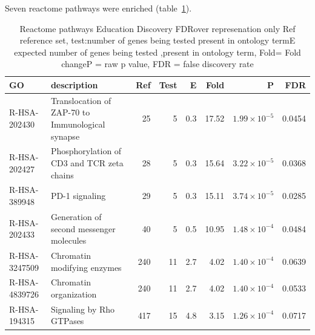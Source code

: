 Seven reactome pathways were enriched (table~\ref{tab:Reactome pathways Education Discovery FDRover represenation only}).
\begin{table}[ht]
\centering
\begin{adjustbox}{width=\textwidth}
\begin{tabular}{llrrrrrr}
  \hline
GO & description & Ref & Test & E & Fold & P & FDR \\ 
  \hline
R-HSA-202430 & Translocation of ZAP-70 to Immunological synapse  & 25 & 5 & 0.3 & 17.52 & $1.99 \times 10^{-5}$ & 0.0454 \\ 
  R-HSA-202427 & Phosphorylation of CD3 and TCR zeta chains  & 28 & 5 & 0.3 & 15.64 & $3.22 \times 10^{-5}$ & 0.0368 \\ 
  R-HSA-389948 & PD-1 signaling  & 29 & 5 & 0.3 & 15.11 & $3.74 \times 10^{-5}$ & 0.0285 \\ 
  R-HSA-202433 & Generation of second messenger molecules  & 40 & 5 & 0.5 & 10.95 & $1.48 \times 10^{-4}$ & 0.0484 \\ 
  R-HSA-3247509 & Chromatin modifying enzymes  & 240 & 11 & 2.7 & 4.02 & $1.40 \times 10^{-4}$ & 0.0639 \\ 
  R-HSA-4839726 & Chromatin organization  & 240 & 11 & 2.7 & 4.02 & $1.40 \times 10^{-4}$ & 0.0533 \\ 
  R-HSA-194315 & Signaling by Rho GTPases  & 417 & 15 & 4.8 & 3.15 & $1.26 \times 10^{-4}$ & 0.0717 \\ 
   \hline
\end{tabular}
\end{adjustbox}
\caption{Reactome pathways Education Discovery FDRover represenation only  Ref reference set, test:number of genes being tested present in ontology termE expected number of genes being tested ,present in ontology term, Fold= Fold changeP = raw p value, FDR = false discovery rate} 
\label{tab:Reactome pathways Education Discovery FDRover represenation only}
\end{table}

           
            
